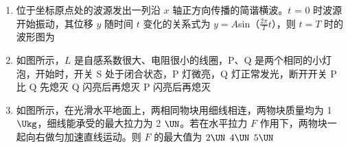 \documentclass[\gkver]{gaokaozhenti}
\begin{document}
\begin{enumerate}
{C．根据电荷数和质量数守恒知，核反应方程为  +  $\to$  + 。故 C 不符合题意；

D．根据电荷数和质量数守恒知，核反应方程为  $\to$  + 。故 D 不符合题意。

故选 A。
}

\item
位于坐标原点处的波源发出一列沿 $x$ 轴正方向传播的简谐横波。$t$ = 0 时波源开始振动，其位移 $y$ 随时间 $t$ 变化的关系式为 $y = A$sin（$\frac{{2\pi }}{T} t$），则 $t = T$ 时的波形图为
\onepicture[w=10.4cm]{}

\item
如图所示，$L$ 是自感系数很大、电阻很小的线圈，P、Q 是两个相同的小灯泡，开始时，开关 S 处于闭合状态，P 灯微亮，Q 灯正常发光，断开开关
{P 比 Q 先熄灭}
{Q 闪亮后再熄灭}
{P 闪亮后再熄灭}

\item
如图所示，在光滑水平地面上，两相同物块用细线相连，两物块质量均为 1 $\Ukg$，细线能承受的最大拉力为 2 $\UN$。若在水平拉力 $F$ 作用下，两物块一起向右做匀加速直线运动。则 $F$ 的最大值为
\onepicture[w=7.8cm]{}
\fourchoices[answer=C]
{$1 \UN$}
{$2 \UN$}
{$4 \UN$}
{$5 \UN$}
\end{enumerate}
\end{document}
